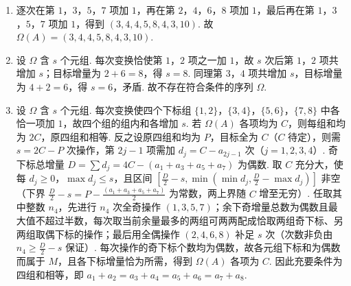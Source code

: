 \begin{solution}
\begin{enumerate}
\item 逐次在第 \(1\)，\(3\)，\(5\)，\(7\) 项加 \(1\)，再在第 \(2\)，\(4\)，\(6\)，\(8\) 项加 \(1\)，最后再在第 \(1\)，\(3\)，\(5\)，\(7\) 项加 \(1\)，得到 \((3,4,4,5,8,4,3,10)\). 故 \(\Omega(A)=(3,4,4,5,8,4,3,10)\).
\item 设 \(\Omega\) 含 \(s\) 个元组. 每次变换恰使第 \(1\)，\(2\) 项之一加 \(1\)，故 \(s\) 次后第 \(1\)，\(2\) 项共增加 \(s\)；目标增量为 \(2+6=8\)，得 \(s=8\). 同理第 \(3\)，\(4\) 项共增加 \(s\)，目标增量为 \(4+2=6\)，得 \(s=6\)，矛盾. 故不存在符合条件的序列 \(\Omega\).
\item 设 \(\Omega\) 含 \(s\) 个元组. 每次变换使四个下标组 \(\{1,2\}\)，\(\{3,4\}\)，\(\{5,6\}\)，\(\{7,8\}\) 中各恰一项加 \(1\)，故四个组的组内和各增加 \(s\). 若 \(\Omega(A)\) 各项均为 \(C\)，则每组和均为 \(2C\)，原四组和相等. 反之设原四组和均为 \(P\)，目标全为 \(C\)（\(C\) 待定），则需 \(s=2C-P\) 次操作，第 \(2j-1\) 项需加 \(d_j=C-a_{2j-1}\) 次（\(j=1,2,3,4\)）. 奇下标总增量 \(D=\sum d_j=4C-(a_1+a_3+a_5+a_7)\) 为偶数. 取 \(C\) 充分大，使每 \(d_j\geqslant0\)，\(\max d_j\leqslant s\)，且区间 \([\frac{D}{2}-s,\min(\min d_j,\frac{D}{2}-\max d_j)]\) 非空（下界 \(\frac{D}{2}-s=P-\frac{(a_1+a_3+a_5+a_7)}{2}\) 为常数，两上界随 \(C\) 增至无穷）. 任取其中整数 \(n_4\)，先进行 \(n_4\) 次全奇操作 \((1,3,5,7)\)；余下奇增量总数为偶数且最大值不超过半数，每次取当前余量最多的两组可两两配成恰取两组奇下标、另两组取偶下标的操作；最后用全偶操作 \((2,4,6,8)\) 补足 \(s\) 次（次数非负由 \(n_4\geqslant \frac{D}{2}-s\) 保证）. 每次操作的奇下标个数均为偶数，故各元组下标和为偶数而属于 \(M\)，且各下标增量恰为所需，得到 \(\Omega(A)\) 各项为 \(C\). 因此充要条件为四组和相等，即 \(a_1+a_2=a_3+a_4=a_5+a_6=a_7+a_8\).
\end{enumerate}
\end{solution}
